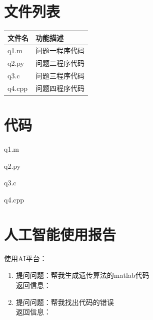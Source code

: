 \documentclass[withoutpreface]{njtechmcmthesis}
\begin{document}
\newpage
\begin{appendices}
\section{文件列表}
\begin{table}[H]
\centering
\begin{tabularx}{\textwidth}{LL}
\toprule
文件名   & 功能描述 \\
\midrule
q1.m & 问题一程序代码 \\
q2.py & 问题二程序代码 \\
q3.c & 问题三程序代码 \\
q4.cpp & 问题四程序代码 \\
\bottomrule
\end{tabularx}
\label{tab:文件列表}
\end{table}

\section{代码}
\noindent q1.m

q2.py

q3.c

q4.cpp

\end{appendices}

\section{人工智能使用报告}
使用AI平台：
\begin{enumerate}
    \item 提问问题：帮我生成遗传算法的matlab代码\\
        返回信息：
    \item 提问问题：帮我找出代码的错误\\
        返回信息：
\end{enumerate}
\end{document}
